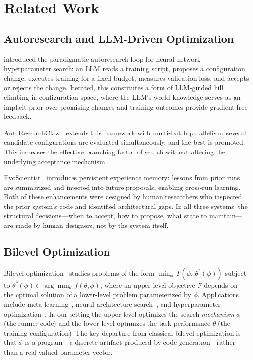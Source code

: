 \section{Related Work}
\label{sec:related}

\subsection{Autoresearch and LLM-Driven Optimization}

\citet{karpathy2026autoresearch} introduced the paradigmatic autoresearch loop
for neural network hyperparameter search: an LLM reads a training script,
proposes a configuration change, executes training for a fixed budget, measures
validation loss, and accepts or rejects the change.
Iterated, this constitutes a form of LLM-guided hill climbing in configuration
space, where the LLM's world knowledge serves as an implicit prior over
promising changes and training outcomes provide gradient-free feedback.

AutoResearchClaw~\citep{aiminglab2026claw} extends this framework with
multi-batch parallelism: several candidate configurations are evaluated
simultaneously, and the best is promoted.
This increases the effective branching factor of search without altering the
underlying acceptance mechanism.

EvoScientist~\citep{evoscientist2026} introduces persistent experience memory:
lessons from prior runs are summarized and injected into future proposals,
enabling cross-run learning.
Both of these enhancements were designed by human researchers who inspected the
prior system's code and identified architectural gaps.
In all three systems, the structural decisions---when to accept, how to
propose, what state to maintain---are made by human designers, not by the
system itself.

\subsection{Bilevel Optimization}

Bilevel optimization~\citep{colson2007overview,sinha2018review} studies
problems of the form
$\min_{\phi}\, F\!\left(\phi,\, \theta^{*}(\phi)\right)$
subject to $\theta^{*}(\phi) \in \arg\min_{\theta}\, f(\theta, \phi)$,
where an upper-level objective $F$ depends on the optimal solution of a
lower-level problem parameterized by $\phi$.
Applications include meta-learning~\citep{franceschi2018bilevel},
neural architecture search~\citep{liu2018darts}, and hyperparameter
optimization~\citep{feurer2019hyperparameter}.
In our setting the upper level optimizes the search \emph{mechanism} $\phi$
(the runner code) and the lower level optimizes the task performance $\theta$
(the training configuration).
The key departure from classical bilevel optimization is that $\phi$ is a
program---a discrete artifact produced by code generation---rather than a
real-valued parameter vector.


